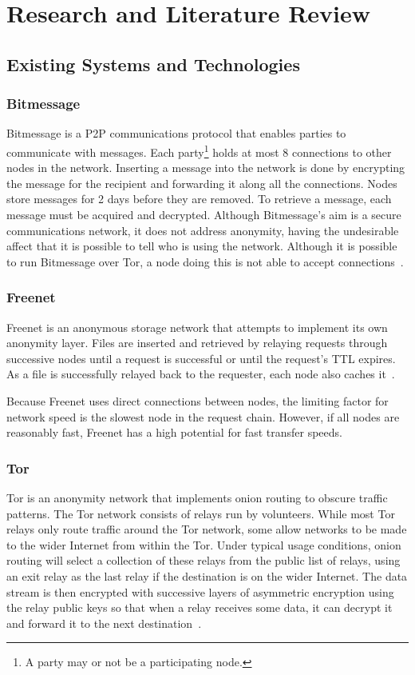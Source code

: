 \section{Research and Literature Review}
	\subsection{Existing Systems and Technologies}
		\subsubsection*{Bitmessage}\label{bitmessage_existing}
			Bitmessage is a P2P communications protocol that enables parties to communicate with messages. Each party\footnote{A party may or not be a participating node.} holds at most 8 connections to other nodes in the network. Inserting a message into the network is done by encrypting the message for the recipient and forwarding it along all the connections. Nodes store messages for 2 days before they are removed. To retrieve a message, each message must be acquired and decrypted. Although Bitmessage's aim is a secure communications network, it does not address anonymity, having the undesirable affect that it is possible to tell who is using the network. Although it is possible to run Bitmessage over Tor, a node doing this is not able to accept connections~\cite{bitmsg}.
		\subsubsection*{Freenet}\label{freenet_existing}
			Freenet is an anonymous storage network that attempts to implement its own anonymity layer. Files are inserted and retrieved by relaying requests through successive nodes until a request is successful or until the request's TTL expires. As a file is successfully relayed back to the requester, each node also caches it~\cite{clarke2001freenet}.
			
			Because Freenet uses direct connections between nodes, the limiting factor for network speed is the slowest node in the request chain. However, if all nodes are reasonably fast, Freenet has a high potential for fast transfer speeds.
		\subsubsection*{Tor}
			Tor is an anonymity network that implements onion routing to obscure traffic patterns. The Tor network consists of relays run by volunteers. While most Tor relays only route traffic around the Tor network, some allow networks to be made to the wider Internet from within the Tor. Under typical usage conditions, onion routing will select a collection of these relays from the public list of relays, using an exit relay as the last relay if the destination is on the wider Internet. The data stream is then encrypted with successive layers of asymmetric encryption using the relay public keys so that when a relay receives some data, it can decrypt it and forward it to the next destination~\cite{dingledine2004tor}.
			
